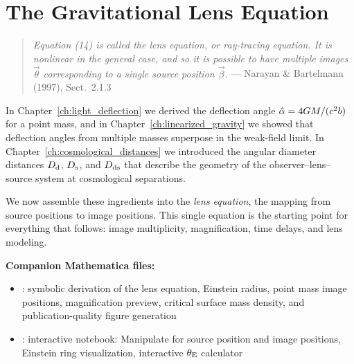 
\chapter{The Gravitational Lens Equation}
\label{ch:lens_equation}

\begin{quote}
\textit{Equation (14) is called the lens equation, or ray-tracing equation.  It is
nonlinear in the general case, and so it is possible to have multiple images
$\vec\theta$ corresponding to a single source position $\vec\beta$.}
\hfill --- Narayan \& Bartelmann (1997), Sect.~2.1.3
\end{quote}

\noindent
In Chapter~\ref{ch:light_deflection} we derived the deflection angle
$\hat{\alpha} = 4G M / (c^2 b)$ for a point mass, and
in Chapter~\ref{ch:linearized_gravity} we showed that deflection angles
from multiple masses superpose in the weak-field limit.  In
Chapter~\ref{ch:cosmological_distances} we introduced the angular diameter
distances $D_{\mathrm{d}}$, $D_{\mathrm{s}}$, and $D_{\mathrm{ds}}$ that describe the geometry of the
observer--lens--source system at cosmological separations.

We now assemble these ingredients into the \emph{lens equation}, the
mapping from source positions to image positions.  This single equation
is the starting point for everything that follows: image multiplicity,
magnification, time delays, and lens modeling.

\medskip
\noindent
\textbf{Companion Mathematica files:}
\begin{itemize}[nosep]
    \item {}:
          symbolic derivation of the lens equation, Einstein radius,
          point mass image positions, magnification preview, critical
          surface mass density, and publication-quality figure generation
    \item {}:
          interactive notebook: Manipulate for source position and
          image positions, Einstein ring visualization, interactive
          $\theta_{\mathrm{E}}$ calculator
\end{itemize}


